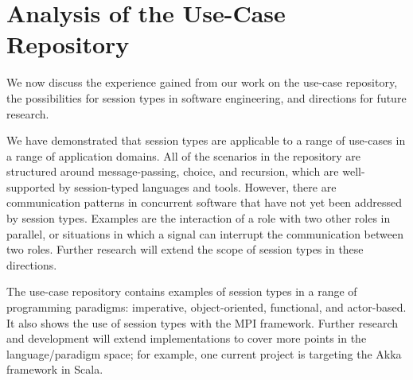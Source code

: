 
\section{Analysis of the Use-Case Repository}
\label{sec:session_engineeering}

We now discuss the experience gained from our work on the use-case repository, the possibilities for session types in software engineering, and directions for future research.



We have demonstrated that session types are applicable to a range of use-cases in a range of application domains. All of the scenarios in the repository are structured around message-passing, choice, and recursion, which are well-supported by session-typed languages and tools. However, there are communication patterns in concurrent software that have not yet been addressed by session types. Examples are the interaction of a role with two other roles in parallel, or situations in which a signal can interrupt the communication between two roles. Further research will extend the scope of session types in these directions. 


The use-case repository contains examples of session types in a range of programming paradigms: imperative, object-oriented, functional, and actor-based. It also shows the use of session types with the MPI framework. Further research and development will extend implementations to cover more points in the language/paradigm space; for example, one current project is targeting the Akka framework in Scala.

